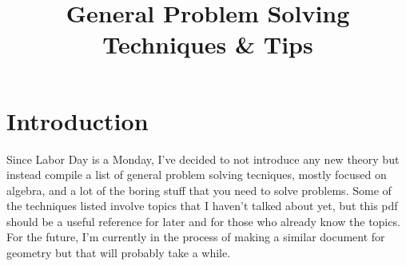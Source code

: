 \documentclass[11pt]{article}
\begin{document}
\title{General Problem Solving Techniques \& Tips}
\maketitle

\section*{Introduction}
Since Labor Day is a Monday, I've decided to not introduce any new theory but instead compile a list of general problem solving tecniques, mostly focused on algebra, and a lot of the boring
stuff that you need to solve problems. Some of the techniques listed involve topics that I haven't talked about yet, but 
this pdf should be a useful reference for later and for those who already know the topics. For the future, I'm currently in the process of making a similar document for geometry but that will probably take a while.
\end{document}
